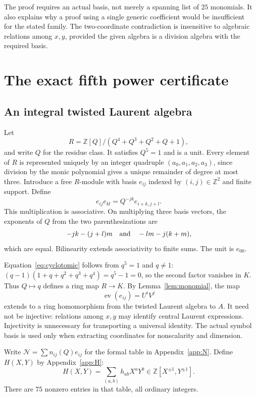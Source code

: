 \documentclass[11pt,letterpaper]{article}
\theoremstyle{definition}
\theoremstyle{remark}
\newcommand{\ZZ}{\mathbb Z}
\newcommand{\ev}{\operatorname{ev}}
\begin{document}
The proof requires an actual basis, not merely a spanning list of $25$
monomials. It also explains why a proof using a single generic coefficient
would be insufficient for the stated family. The two-coordinate
contradiction is insensitive to algebraic relations among $x,y$, provided
the given algebra is a division algebra with the required basis.

\section{The exact fifth power certificate}\label{sec:certificate}

\subsection{An integral twisted Laurent algebra}

Let
\[
R=\ZZ[Q]/(Q^4+Q^3+Q^2+Q+1),
\]
and write $Q$ for the residue class. It satisfies $Q^5=1$ and is a unit.
Every element of $R$ is represented uniquely by an integer quadruple
$(a_0,a_1,a_2,a_3)$, since division by the monic polynomial gives a unique
remainder of degree at most three. Introduce a free $R$-module with basis
$e_{ij}$ indexed by $(i,j)\in\ZZ^2$ and finite support. Define
\begin{equation}\label{eq:twisted}
e_{ij}e_{kl}=Q^{-jk}e_{i+k,j+l}.
\end{equation}
This multiplication is associative. On multiplying three basis vectors,
the exponents of $Q$ from the two parenthesizations are
\[
-jk-(j+l)m\quad\hbox{and}\quad-lm-j(k+m),
\]
which are equal. Bilinearity extends associativity to finite sums.
The unit is $e_{00}$.

Equation~\eqref{eq:cyclotomic} follows from $q^5=1$ and $q\ne1$:
$(q-1)(1+q+q^2+q^3+q^4)=q^5-1=0$, so the second factor vanishes in
$K$. Thus $Q\mapsto q$ defines a ring map $R\to K$. By
Lemma~\ref{lem:monomial}, the map
\begin{equation}\label{eq:evaluation}
\ev(e_{ij})=U^iV^j
\end{equation}
extends to a ring homomorphism from the twisted Laurent algebra to $A$.
It need not be injective: relations among $x,y$ may identify central
Laurent expressions. Injectivity is unnecessary for transporting a
universal identity. The actual symbol basis is used only when extracting
coordinates for nonscalarity and dimension.

Write $\mathcal N=\sum n_{ij}(Q)e_{ij}$ for the formal table in
Appendix~\ref{app:N}. Define $H(X,Y)$ by Appendix~\ref{app:H}:
\begin{equation}\label{eq:H}
H(X,Y)=\sum_{(a,b)}h_{ab}X^aY^b\in\ZZ[X^{\pm1},Y^{\pm1}].
\end{equation}
There are $75$ nonzero entries in that table, all ordinary integers.
\end{document}
